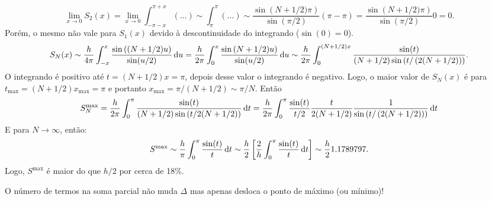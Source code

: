 \begin{dmath*}
  \lim_{x \to 0} S_2(x) = \lim_{x \to 0} \int_{-\pi - x}^{\pi + x} \left( \ldots
  \right)
  \sim \int_{\pi}^{\pi} \left( \ldots \right)
  \sim \frac{\sin\left( N + 1 / 2) \pi \right)}{\sin(\pi / 2)} (\pi - \pi)
  = \frac{\sin\left( N + 1 / 2) \pi \right)}{\sin(\pi / 2)} 0
  = 0.
\end{dmath*}
Porém, o mesmo não vale para $S_1(x)$ devido à descontinuidade do integrando
($\sin(0) = 0$).
\begin{dmath*}
  S_N(x) \sim \frac{h}{4 \pi} \int_{-x}^{x} \frac{\sin\left( (N + 1 / 2) u
  \right)}{\sin(u / 2)} \vi{u}
  = \frac{h}{2 \pi} \int_0^x \frac{\sin\left( N + 1 / 2) u \right)}{\sin(u / 2)}
  \vi{u}
  \sim \frac{h}{2 \pi} \int_0^{(N + 1 / 2) x} \frac{\sin(t)}{(N + 1 / 2)
  \sin\left( t / \left( 2 (N + 1/2) \right) \right)}.
\end{dmath*}
O integrando é positivo até $t = (N + 1 / 2) x = \pi$, depois desse valor o
integrando é negativo. Logo, o maior valor de $S_N(x)$ é para $t_{\max} = (N +
1/2) x_{\max} = \pi$ e portanto $x_{\max} = \pi / (N + 1/2) \sim \pi / N$. Então
\begin{dmath*}
  S_N^{\max} = \frac{h}{2 \pi} \int_0^{\pi} \frac{\sin(t)}{(N + 1/2) \sin\left(
  t / 2 (N + 1 / 2) \right)} \vi{t}
  = \frac{h}{2 \pi} \int_0^{\pi} \frac{\sin(t)}{t / 2} \frac{t}{2 (N + 1 / 2)}
  \frac{1}{\sin\left( t / \left( 2 (N + 1 / 2) \right) \right)}\vi{t}
\end{dmath*}
E para $N \to \infty$, então:
\begin{dmath*}
  S^{\max} \sim \frac{h}{\pi} \int_0^{\pi} \frac{\sin(t)}{t} \vi{t}
  \sim \frac{h}{2} \left[ \frac{2}{h} \int_0^{\pi} \frac{\sin(t)}{t} \vi{t} \right]
  \sim \frac{h}{2} 1.1789797.
\end{dmath*}
Logo, $S^{\max}$ é maior do que $h / 2$ por cerca de 18\%.

\begin{obs}
  O número de termos na soma parcial não muda $\Delta$ mas apenas desloca o
  ponto de máximo (ou mínimo)!
\end{obs}

